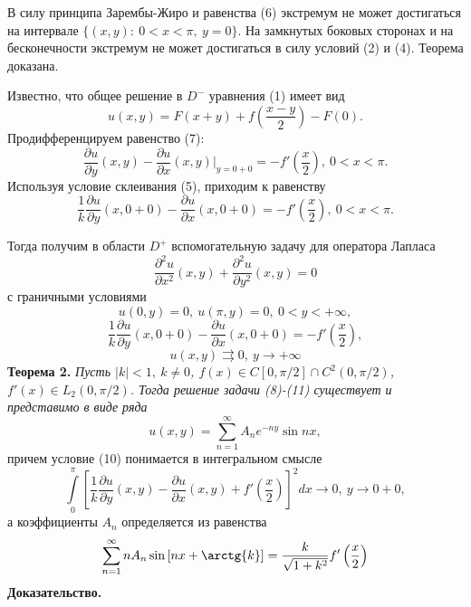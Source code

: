 \documentclass[9pt]{article}
\begin{document}
	В силу принципа Зарембы-Жиро и равенства (6) экстремум не может достигаться на интервале $\{(x,y):\ 0 < x < \pi, \ y = 0\}$. На замкнутых боковых сторонах и на бесконечности экстремум не может достигаться в силу условий (2) и (4). Теорема доказана.
	
	Известно, что общее решение в $D^{-}$  уравнения (1) имеет вид 
	\begin{equation}
		u(x,y) = F(x+y) + f(\dfrac{x-y}{2}) - F(0).
	\end{equation}
	Продифференцируем равенство (7):
	\begin{equation*}
		\dfrac{\partial u}{\partial y}(x,y) - \dfrac{\partial u}{\partial x}(x,y) \vert_{y=0+0} = -f'\left(\dfrac{x}2\right), \ 0 < x < \pi.
	\end{equation*}
	Используя условие склеивания (5), приходим к равенству
	\begin{equation*}
		\dfrac{1}{k} \dfrac{\partial u}{\partial y}(x, 0+0) - \dfrac{\partial u}{\partial x}(x, 0 + 0) = - f'\left(\dfrac{x}2\right), \ 0 < x < \pi. 
	\end{equation*}
	
	Тогда получим в области $D^{+}$ вспомогательную задачу для оператора Лапласа 
	\begin{equation}
		\dfrac{\partial^2 u}{\partial x^2}(x,y) + \dfrac{\partial^2 u}{\partial y^2}(x,y) = 0
	\end{equation}
	с граничными условиями 
	\begin{equation}
		u(0,y) = 0, \ u(\pi, y) = 0, \ 0 < y < +\infty, 
	\end{equation}
	\begin{equation}
		\dfrac{1}{k} \dfrac{\partial u}{\partial y}(x,0+0) - \dfrac{\partial u}{\partial x}(x,0+0) = -f'\left(\dfrac{x}{2}\right),
	\end{equation}
	\begin{equation}
		u(x,y) \rightrightarrows 0, \ y \to +\infty 
	\end{equation}
	\textbf{Теорема 2.} \textit{Пусть $|k| < 1, \ k \neq 0$, $f(x) \in C[0, \pi/2] \cap C^2(0, \pi/2)$, $f'(x) \in L_2(0, \pi/2)$. Тогда решение задачи (8)-(11) существует и представимо в виде ряда
	\begin{equation*}
		u(x,y) = \sum\limits_{n=1}^{\infty} A_n e^{-ny} \sin{nx},
		\end{equation*}}
	причем условие (10) понимается в интегральном смысле
	\begin{equation*}
		\int\limits_0^\pi \left[	\dfrac{1}{k} \dfrac{\partial u}{\partial y}(x,y) - \dfrac{\partial u}{\partial x}(x,y) + f'\left(\dfrac{x}{2}\right)\right]^2 dx \to 0, \ y \to 0 + 0,
	\end{equation*}
	а коэффициенты $A_n$ определяется из равенства
	\begin{equation}
		\sum\limits_{n=1}^{\infty} n A_n \sin{\left[nx + \arctg{k}\right]} = \dfrac{k}{\sqrt{1 + k^2}} f'\left(\dfrac{x}{2}\right) 
	\end{equation}
	\textbf{Доказательство.} 
	
\end{document}
